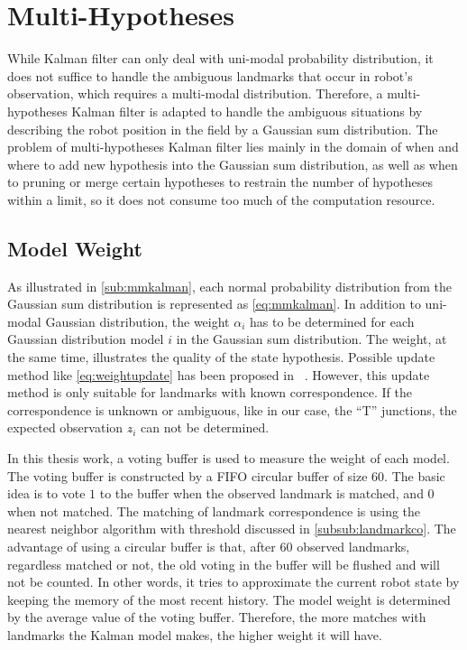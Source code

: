 \chapter{Multi-Hypotheses\label{cha:chapter5}}
While Kalman filter can only deal with uni-modal probability distribution, it does not suffice to handle the ambiguous landmarks that occur in robot's observation, which requires a multi-modal distribution. Therefore, a multi-hypotheses Kalman filter is adapted to handle the ambiguous situations by describing the robot position in the field by a Gaussian sum distribution.
The problem of multi-hypotheses Kalman filter lies mainly in the domain of when and where to add new hypothesis into the Gaussian sum distribution, as well as when to pruning or merge certain hypotheses to restrain the number of hypotheses within a limit, so it does not consume too much of the computation resource.


\section{Model Weight}
As illustrated in \autoref{sub:mmkalman}, each normal probability distribution from the Gaussian sum distribution is represented as \autoref{eq:mmkalman}. In addition to uni-modal Gaussian distribution, the weight $\alpha_i$ has to be determined for each Gaussian distribution model $i$ in the Gaussian sum distribution. The weight, at the same time, illustrates the quality of the state hypothesis. Possible update method like \autoref{eq:weightupdate} has been proposed in ~\cite{alspach1972nonlinear}. However, this update method is only suitable for landmarks with known correspondence. If the correspondence is unknown or ambiguous, like in our case, the ``T'' junctions, the expected observation $z\widehat{}_i$ can not be determined. 

In this thesis work, a voting buffer is used to measure the weight of each model. The voting buffer is constructed by a \gls{FIFO} circular buffer of size $60$. The basic idea is to vote $1$ to the buffer when the observed landmark is matched, and $0$ when not matched. The matching of landmark correspondence is using the nearest neighbor algorithm with threshold discussed in \autoref{subsub:landmarkco}. 
The advantage of using a circular buffer is that, after $60$ observed landmarks, regardless matched or not, the old voting in the buffer will be flushed and will not be counted. In other words, it tries to approximate the current robot state by keeping the memory of the most recent history. The model weight is determined by the average value of the voting buffer. Therefore, the more matches with landmarks the Kalman model makes, the higher weight it will have. 

